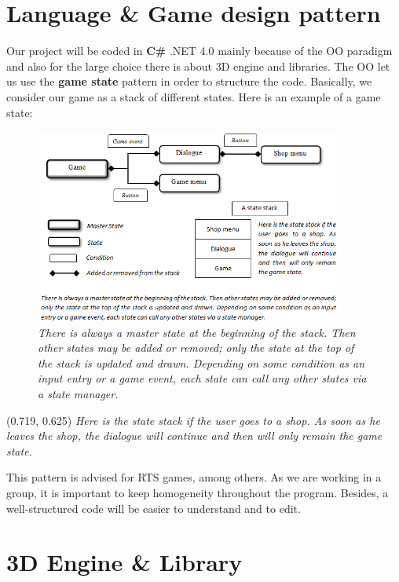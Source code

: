 \documentclass[article]{report} %
\begin{document}
     					\section{Language \& Game design pattern}
     						Our project will be coded in \textbf{C\#} .NET 4.0 mainly because of the \ac{OO} paradigm and also for the large choice there is about 3D engine and libraries. The \ac{OO} let us use the \textbf{game state} pattern in order to structure the code. Basically, we consider our game as a stack of different states. Here is an example of a game state:
						\begin{figure}[h]
							
							\centering
							\includegraphics[height=242px]{Images/GameStateDesign.png}
							\it \\ There is always a master state at the beginning of the stack. Then other states may be added or removed; only the state at the top of the stack is updated and drawn. Depending on some condition as an input entry or a game event, each state can call any other states via a state manager.
						\end{figure}

						\begin{textblock}{0.128}(0.719, 0.625)
							\noindent \it 	Here is the state stack if the user goes to a shop. As soon as he leaves the shop, the dialogue will continue and then will only remain the game state.
						\end{textblock}
     						
     						This pattern is advised for \ac{RTS} games, among others. As we are working in a group, it is important to keep homogeneity throughout the program. Besides, a well-structured code will be easier to understand and to edit.
						
						\section{3D Engine \& Library}
						
\end{document}
